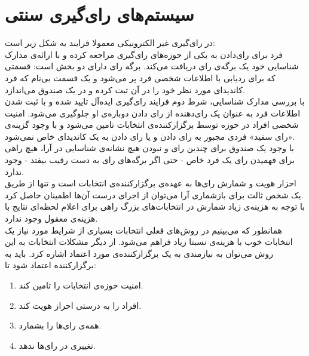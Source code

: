\section{سیستم‌های رای‌گیری سنتی}
\par
در رای‌گیری غیر الکترونیکی معمولا فرایند به شکل زیر است:
\\
فرد برای رای‌دادن به یکی از حوزه‌های رای‌گیری مراجعه کرده و با ارائه‌ی مدارک شناسایی خود یک برگه‌ی رای دریافت می‌کند. برگه رای دارای دو بخش است: قسمتی که برای ردیابی با اطلاعات شخصی فرد پر می‌شود و یک قسمت بی‌نام که فرد کاندیدای مورد نظر خود را در آن ثبت کرده و در یک صندوق می‌اندازد. 
\\
با بررسی مدارک شناسایی، شرط دوم فرایند رای‌گیری ایده‌آل تایید شده و با ثبت شدن اطلاعات فرد به عنوان یک رای‌دهنده از رای دادن دوباره‌ی او جلوگیری می‌شود. امنیت شخصی افراد در حوزه توسط برگزارکننده‌ی انتخابات تامین می‌شود و با وجود گزینه‌ی «رای سفید» فردی مجبور به رای دادن و یا رای دادن به یک کاندیدای خاص نمی‌شود. 
\\
با وجود یک صندوق برای چندین رای و نبودن هیچ نشانه‌ی شناسایی در آرا، هیچ راهی برای فهمیدن رای یک فرد خاص - حتی اگر برگه‌های رای به دست رقیب بیفتد - وجود ندارد. 
\\
احزار هویت و شمارش رای‌ها به عهده‌ی برگزارکننده‌ی انتخابات است و تنها از طریق یک شخص ثالث برای باز‌شماری آرا می‌توان از اجرای درست آن‌ها اطمینان حاصل کرد.
\\
با توجه به هزینه‌ی زیاد شمارش در انتخابات‌های بزرگ راهی برای اعلام لحظه‌ا‌ی نتایج با هزینه‌ی معقول وجود ندارد.
\\
همانطور که می‌بینیم در روش‌های فعلی انتخابات بسیاری از شرایط مورد نیاز یک انتخابات خوب  با هزینه‌ی نسبتا زیاد فراهم می‌شود. از دیگر مشکلات انتخابات به این روش می‌توان به نیازمندی به یک برگزارکننده‌ی مورد اعتماد اشاره کرد. باید به برگزارکننده اعتماد شود تا: 
\begin{enumerate}
	\item 
	امنیت حوزه‌ی انتخابات را تامین کند.
	\item 
	افراد را به درستی احراز هویت کند.
	\item 
	همه‌ی رای‌ها را بشمارد.
	\item 
	تغییری در رای‌ها ندهد.
	
\end{enumerate}
 

